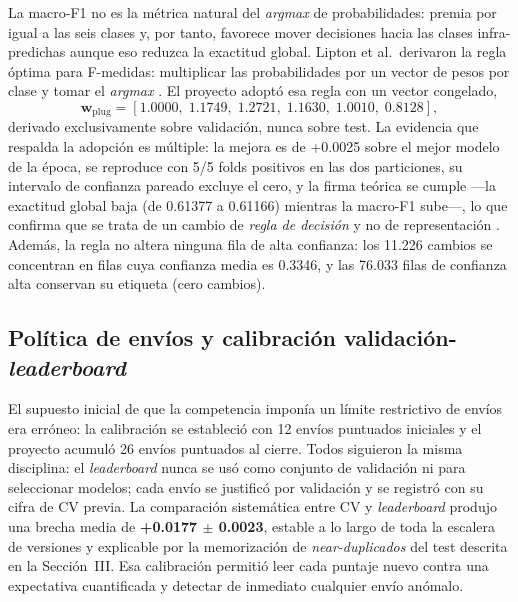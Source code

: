 \documentclass[journal]{IEEEtai}
\begin{document}
La macro-F1 no es la m\'etrica natural del \textit{argmax} de probabilidades: premia por igual a las seis clases y, por tanto, favorece mover decisiones hacia las clases infra-predichas aunque eso reduzca la exactitud global. Lipton et al.\ derivaron la regla \'optima para F-medidas: multiplicar las probabilidades por un vector de pesos por clase y tomar el \textit{argmax} \cite{lipton2014}. El proyecto adopt\'o esa regla con un vector congelado,
\begin{equation}
\mathbf{w}_{\text{plug}} = [1.0000,\; 1.1749,\; 1.2721,\; 1.1630,\; 1.0010,\; 0.8128],
\label{eq:plugin}
\end{equation}
derivado exclusivamente sobre validaci\'on, nunca sobre test. La evidencia que respalda la adopci\'on es m\'ultiple: la mejora es de +0.0025 sobre el mejor modelo de la \'epoca, se reproduce con 5/5 folds positivos en las dos particiones, su intervalo de confianza pareado excluye el cero, y la firma te\'orica se cumple ---la exactitud global baja (de 0.61377 a 0.61166) mientras la macro-F1 sube---, lo que confirma que se trata de un cambio de \emph{regla de decisi\'on} y no de representaci\'on \cite{parambath2014,waegeman2014,narasimhan2015,eban2017}. Adem\'as, la regla no altera ninguna fila de alta confianza: los 11.226 cambios se concentran en filas cuya confianza media es 0.3346, y las 76.033 filas de confianza alta conservan su etiqueta (cero cambios).

\subsection{Pol\'itica de env\'ios y calibraci\'on validaci\'on-\textit{leaderboard}}

El supuesto inicial de que la competencia impon\'ia un l\'imite restrictivo de env\'ios era err\'oneo: la calibraci\'on se estableci\'o con 12 env\'ios puntuados iniciales y el proyecto acumul\'o 26 env\'ios puntuados al cierre. Todos siguieron la misma disciplina: el \textit{leaderboard} nunca se us\'o como conjunto de validaci\'on ni para seleccionar modelos; cada env\'io se justific\'o por validaci\'on y se registr\'o con su cifra de CV previa. La comparaci\'on sistem\'atica entre CV y \textit{leaderboard} produjo una brecha media de \textbf{+0.0177 $\pm$ 0.0023}, estable a lo largo de toda la escalera de versiones y explicable por la memorizaci\'on de \textit{near-duplicados} del test descrita en la Secci\'on~III. Esa calibraci\'on permiti\'o leer cada puntaje nuevo contra una expectativa cuantificada y detectar de inmediato cualquier env\'io an\'omalo.
\end{document}
